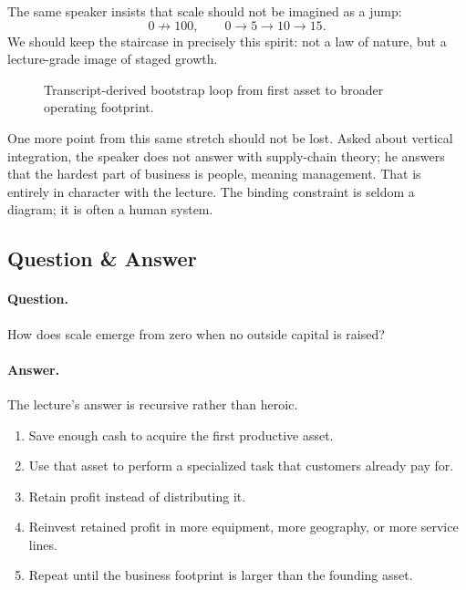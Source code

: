 The same speaker insists that scale should not be imagined as a jump:
\begin{equation}
0 \not\to 100,\qquad 0 \to 5 \to 10 \to 15.
\end{equation}
We should keep the staircase in precisely this spirit: not a law of nature, but a lecture-grade image of staged growth.

\begin{figure}[h]
\centering
{}
\caption{Transcript-derived bootstrap loop from first asset to broader operating footprint.}
\end{figure}

One more point from this same stretch should not be lost. Asked about vertical integration, the speaker does not answer with supply-chain theory; he answers that the hardest part of business is people, meaning management. That is entirely in character with the lecture. The binding constraint is seldom a diagram; it is often a human system.

\subsection{Question \& Answer}

\paragraph{Question.} How does scale emerge from zero when no outside capital is raised?

\paragraph{Answer.} The lecture's answer is recursive rather than heroic.

\begin{enumerate}
\item Save enough cash to acquire the first productive asset.
\item Use that asset to perform a specialized task that customers already pay for.
\item Retain profit instead of distributing it.
\item Reinvest retained profit in more equipment, more geography, or more service lines.
\item Repeat until the business footprint is larger than the founding asset.
\end{enumerate}

